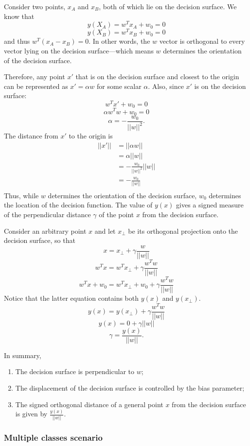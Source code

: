 \documentclass[a4paper,12pt]{article}
\begin{document}
Consider two points, $x_A$ and $x_B$, both of which lie on the decision surface. We know that 
$$y(X_A) = w^Tx_A + w_0 = 0$$
$$y(X_B) = w^Tx_B + w_0 = 0$$
and thus $w^T(x_A - x_B) = 0$. In other words, the $w$ vector is orthogonal to every vector lying on the decision surface---which means $w$ determines the orientation of the decision surface. 

Therefore, any point $x'$ that is on the decision surface and closest to the origin can be represented as $x' = \alpha w$ for some scalar $\alpha$. Also, since $x'$ is on the decision surface: 
$$w^Tx' + w_0 = 0$$
$$\alpha w^T w + w_0 = 0$$
$$\alpha = - \frac{w_0}{||w||^2}.$$
The distance from $x'$ to the origin is 
\begin{align*}
||x'|| &= ||\alpha w|| \\
		&= \alpha ||w|| \\
		&= - \frac{w_0}{||w||^2}||w|| \\
		&= - \frac{w_0}{||w||} \\
\end{align*}
Thus, while $w$ determines the orientation of the decision surface, $w_0$ determines the location of the decision function. The value of $y(x)$ gives a signed measure of the perpendicular distance $\gamma$ of the point $x$ from the decision surface. 

Consider an arbitrary point $x$ and let $x_\bot$ be its orthogonal projection onto the decision surface, so that 
$$x = x_\bot + \gamma \frac{w}{||w||}$$
$$w^Tx = w^Tx_\bot + \gamma \frac{w^Tw}{||w||}$$
$$w^Tx + w_0 = w^Tx_\bot + w_0 +  \gamma \frac{w^Tw}{||w||}$$
Notice that the latter equation contains both $y(x)$ and $y(x_\bot)$. 
$$y(x) = y(x_\bot) + \gamma \frac{w^Tw}{||w||}$$
$$y(x) = 0 + \gamma ||w||$$
$$\gamma = \frac{y(x)}{||w||}.$$

In summary, 
\begin{enumerate}
\item
The decision surface is perpendicular to $w$;
\item
The displacement of the decision surface is controlled by the bias parameter; 
\item
The signed orthogonal distance of a general point $x$ from the decision surface is given by $\frac{y(x)}{||w||}$. 
\end{enumerate}

\subsubsection{Multiple classes scenario}
\end{document}
